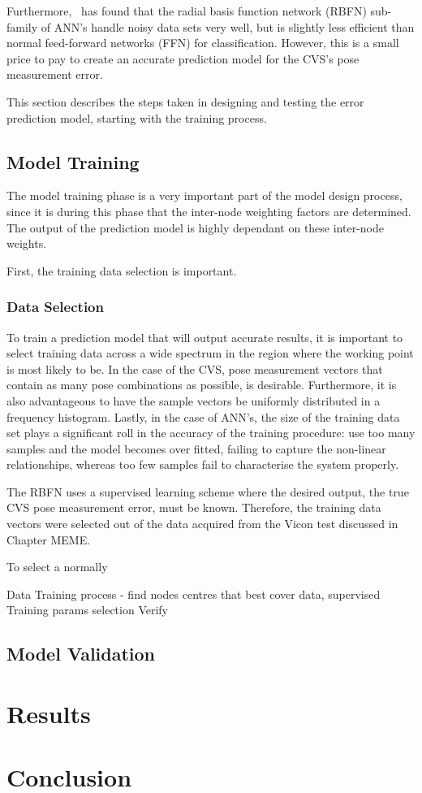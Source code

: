 Furthermore,~\cite{xie2011comparison} has found that the radial basis function network (RBFN) sub-family of ANN's handle noisy data sets very well, but is slightly less efficient than normal feed-forward networks (FFN) for classification. However, this is a small price to pay to create an accurate prediction model for the CVS's pose measurement error. 

This section describes the steps taken in designing and testing the error prediction model, starting with the training process.

\subsection{Model Training}

The model training phase is a very important part of the model design process, since it is during this phase that the inter-node weighting factors are determined. The output of the prediction model is highly dependant on these inter-node weights.  

First, the training data selection is important. 
\subsubsection{Data Selection}

To train a prediction model that will output accurate results, it is important to select training data across a wide spectrum in the region where the working point is most likely to be. In the case of the CVS, pose measurement vectors that contain as many pose combinations as possible, is desirable. Furthermore, it is also advantageous to have the sample vectors be uniformly distributed in a frequency histogram. Lastly, in the case of ANN's, the size of the training data set plays a significant roll in the accuracy of the training procedure: use too many samples and the model becomes over fitted, failing to capture the non-linear relationships, whereas too few samples fail to characterise the system properly. 

The RBFN uses a supervised learning scheme where the desired output, the true CVS pose measurement error, must be known. Therefore, the training data vectors were selected out of the data acquired from the Vicon test discussed in Chapter MEME.

To select a normally

Data
Training process - find nodes centres that best cover data, supervised
Training params selection
Verify

\subsection{Model Validation}

\section{Results}

\section{Conclusion}


